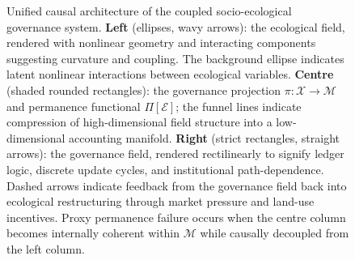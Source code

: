 \documentclass[12pt]{article}
\newcommand{\Ecal}{\mathcal{E}}
\newcommand{\Xcal}{\mathcal{X}}
\newcommand{\Mcal}{\mathcal{M}}
\begin{document}
\begin{figure}[h]
\caption{Unified causal architecture of the coupled socio-ecological governance system.
\textbf{Left} (ellipses, wavy arrows): the ecological field, rendered with nonlinear
geometry and interacting components suggesting curvature and coupling. The background
ellipse indicates latent nonlinear interactions between ecological variables. \textbf{Centre}
(shaded rounded rectangles): the governance projection $\pi:\Xcal\to\Mcal$ and permanence
functional $\Pi[\Ecal]$; the funnel lines indicate compression of high-dimensional field
structure into a low-dimensional accounting manifold. \textbf{Right} (strict rectangles,
straight arrows): the governance field, rendered rectilinearly to signify ledger logic,
discrete update cycles, and institutional path-dependence. Dashed arrows indicate feedback
from the governance field back into ecological restructuring through market pressure and
land-use incentives. Proxy permanence failure occurs when the centre column becomes
internally coherent within $\Mcal$ while causally decoupled from the left column.}
\label{fig:architecture}
\end{figure}
\end{document}
